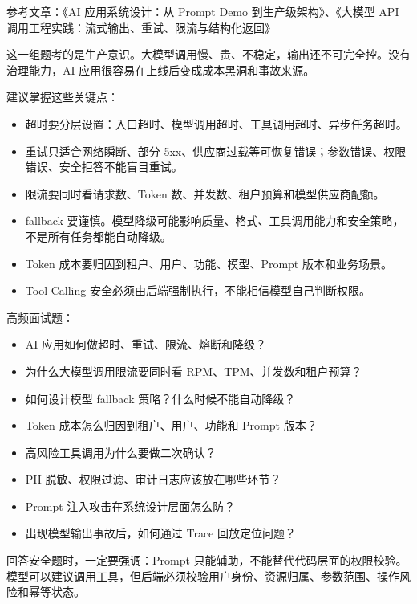 \documentclass[9pt,a4paper,twocolumn]{ctexart}
\begin{document}
参考文章：《AI 应用系统设计：从 Prompt Demo 到生产级架构》、《大模型 API 调用工程实践：流式输出、重试、限流与结构化返回》



这一组题考的是生产意识。大模型调用慢、贵、不稳定，输出还不可完全控。没有治理能力，AI 应用很容易在上线后变成成本黑洞和事故来源。



建议掌握这些关键点：


\begin{itemize}[itemsep=1pt, topsep=2pt]
  \item 超时要分层设置：入口超时、模型调用超时、工具调用超时、异步任务超时。
  \item 重试只适合网络瞬断、部分 5xx、供应商过载等可恢复错误；参数错误、权限错误、安全拒答不能盲目重试。
  \item 限流要同时看请求数、Token 数、并发数、租户预算和模型供应商配额。
  \item fallback 要谨慎。模型降级可能影响质量、格式、工具调用能力和安全策略，不是所有任务都能自动降级。
  \item Token 成本要归因到租户、用户、功能、模型、Prompt 版本和业务场景。
  \item Tool Calling 安全必须由后端强制执行，不能相信模型自己判断权限。
\end{itemize}


高频面试题：


\begin{itemize}[itemsep=1pt, topsep=2pt]
  \item AI 应用如何做超时、重试、限流、熔断和降级？
  \item 为什么大模型调用限流要同时看 RPM、TPM、并发数和租户预算？
  \item 如何设计模型 fallback 策略？什么时候不能自动降级？
  \item Token 成本怎么归因到租户、用户、功能和 Prompt 版本？
  \item 高风险工具调用为什么要做二次确认？
  \item PII 脱敏、权限过滤、审计日志应该放在哪些环节？
  \item Prompt 注入攻击在系统设计层面怎么防？
  \item 出现模型输出事故后，如何通过 Trace 回放定位问题？
\end{itemize}


回答安全题时，一定要强调：Prompt 只能辅助，不能替代代码层面的权限校验。模型可以建议调用工具，但后端必须校验用户身份、资源归属、参数范围、操作风险和幂等状态。
\end{document}
